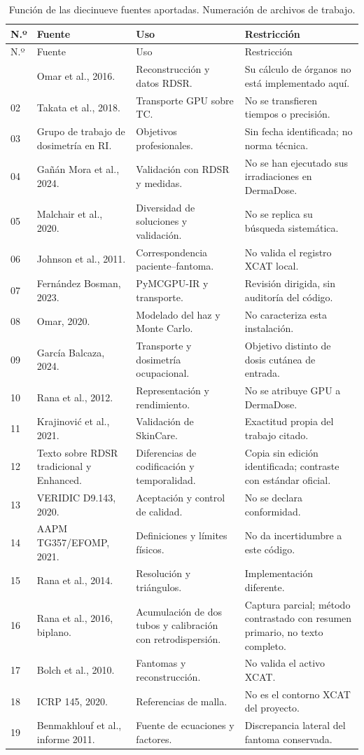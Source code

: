 \begin{longtable}{p{9mm}p{43mm}p{49mm}p{37mm}}
\caption{Función de las diecinueve fuentes aportadas. Numeración de archivos de trabajo.}\\
\toprule N.º & Fuente & Uso & Restricción\\\midrule\endfirsthead
\toprule N.º & Fuente & Uso & Restricción\\\midrule\endhead
\bottomrule\endfoot
01 & Omar et al., 2016. & Reconstrucción y datos RDSR. & Su cálculo de órganos no está implementado aquí.\\
02 & Takata et al., 2018. & Transporte GPU sobre TC. & No se transfieren tiempos o precisión.\\
03 & Grupo de trabajo de dosimetría en RI. & Objetivos profesionales. & Sin fecha identificada; no norma técnica.\\
04 & Gañán Mora et al., 2024. & Validación con RDSR y medidas. & No se han ejecutado sus irradiaciones en DermaDose.\\
05 & Malchair et al., 2020. & Diversidad de soluciones y validación. & No se replica su búsqueda sistemática.\\
06 & Johnson et al., 2011. & Correspondencia paciente--fantoma. & No valida el registro XCAT local.\\
07 & Fernández Bosman, 2023. & PyMCGPU-IR y transporte. & Revisión dirigida, sin auditoría del código.\\
08 & Omar, 2020. & Modelado del haz y Monte Carlo. & No caracteriza esta instalación.\\
09 & García Balcaza, 2024. & Transporte y dosimetría ocupacional. & Objetivo distinto de dosis cutánea de entrada.\\
10 & Rana et al., 2012. & Representación y rendimiento. & No se atribuye GPU a DermaDose.\\
11 & Krajinović et al., 2021. & Validación de SkinCare. & Exactitud propia del trabajo citado.\\
12 & Texto sobre RDSR tradicional y Enhanced. & Diferencias de codificación y temporalidad. & Copia sin edición identificada; contraste con estándar oficial.\\
13 & VERIDIC D9.143, 2020. & Aceptación y control de calidad. & No se declara conformidad.\\
14 & AAPM TG357/EFOMP, 2021. & Definiciones y límites físicos. & No da incertidumbre a este código.\\
15 & Rana et al., 2014. & Resolución y triángulos. & Implementación diferente.\\
16 & Rana et al., 2016, biplano. & Acumulación de dos tubos y calibración con retrodispersión. & Captura parcial; método contrastado con resumen primario, no texto completo.\\
17 & Bolch et al., 2010. & Fantomas y reconstrucción. & No valida el activo XCAT.\\
18 & ICRP 145, 2020. & Referencias de malla. & No es el contorno XCAT del proyecto.\\
19 & Benmakhlouf et al., informe 2011. & Fuente de ecuaciones y factores. & Discrepancia lateral del fantoma conservada.\\
\end{longtable}
